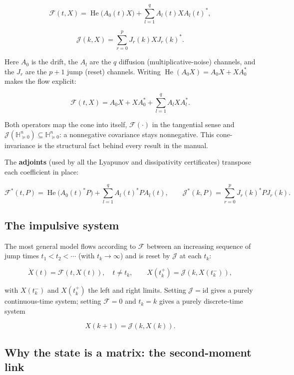 \documentclass[11pt,oneside]{report}
\begin{document}
\[\mathcal{F}(t,X)=\operatorname{He}\big(A_0(t) X\big)+\sum_{l=1}^{q}A_l(t) X A_l(t)^{*},\]

\[\mathcal{J}(k,X)=\sum_{r=0}^{p}J_r(k) X J_r(k)^{*}.\]

Here \(A_0\) is the drift, the \(A_l\) are the \(q\) diffusion (multiplicative-noise)
channels, and the \(J_r\) are the \(p+1\) jump (reset) channels. Writing
\(\operatorname{He}(A_0X)=A_0X+XA_0^{*}\) makes the flow explicit:

\[\mathcal{F}(t,X)=A_0X+XA_0^{*}+\sum_{l=1}^{q}A_lXA_l^{*}.\]

Both operators map the cone into itself, \(\mathcal{F}(\cdot)\) in the tangential
sense and \(\mathcal{J}(\mathbb{H}^n_{\succeq0})\subseteq\mathbb{H}^n_{\succeq0}\):
a nonnegative covariance stays nonnegative. This cone-invariance is the
structural fact behind every result in the manual.

The \textbf{adjoints} (used by all the Lyapunov and dissipativity certificates)
transpose each coefficient in place:

\[\mathcal{F}^{*}(t,P)=\operatorname{He}\big(A_0(t)^{*}P\big)+\sum_{l=1}^{q}A_l(t)^{*} P A_l(t),\qquad \mathcal{J}^{*}(k,P)=\sum_{r=0}^{p}J_r(k)^{*} P J_r(k).\]

\hypertarget{the-impulsive-template}{%
\subsection{The impulsive system}\label{the-impulsive-template}}

The most general model flows according to \(\mathcal{F}\) between an increasing
sequence of jump times \(t_1<t_2<\cdots\) (with \(t_k\to\infty\)) and is reset by
\(\mathcal{J}\) at each \(t_k\):

\[\dot X(t)=\mathcal{F}(t,X(t)),\quad t\neq t_k,\qquad X(t_k^{+})=\mathcal{J}(k,X(t_k^{-})),\]

with \(X(t_k^{-})\) and \(X(t_k^{+})\) the left and right limits. Setting
\(\mathcal{J}=\mathrm{id}\) gives a purely continuous-time system; setting
\(\mathcal{F}=0\) and \(t_k=k\) gives a purely discrete-time system

\[X(k+1)=\mathcal{J}(k,X(k)).\]

\hypertarget{why-the-state-is-a-matrix-the-second-moment-link}{%
\subsection{Why the state is a matrix: the second-moment link}\label{why-the-state-is-a-matrix-the-second-moment-link}}
\end{document}
